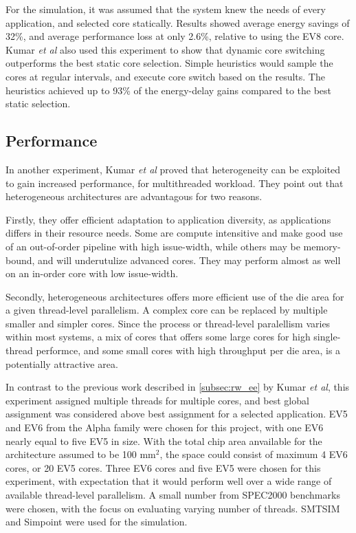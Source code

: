For the simulation, it was assumed that the system knew the needs of every application, and selected core statically. 
Results showed average energy savings of 32\%, and average performance loss at only 2.6\%, relative to using the EV8 core.
Kumar \textit{et al} also used this experiment to show that dynamic core switching outperforms the best static core selection.
Simple heuristics would sample the cores at regular intervals, and execute core switch based on the results.
The heuristics achieved up to 93\% of the energy-delay gains compared to the best static selection. 

\subsection{Performance}
\label{subsec:rw_perf}
In another experiment, Kumar \textit{et al}\cite{heterogeneous-perf} proved that heterogeneity can be exploited to gain increased performance, for multithreaded workload.
They point out that heterogeneous architectures are advantagous for two reasons.

Firstly, they offer efficient adaptation to application diversity, as applications differs in their resource needs.
Some are compute intensitive and make good use of an out-of-order pipeline with high issue-width, while others may be memory-bound, and will underutulize advanced cores.
They may perform almost as well on an in-order core with low issue-width\cite{heterogeneous-perf}.

Secondly, heterogeneous architectures offers more efficient use of the die area for a given thread-level parallelism.
A complex core can be replaced by multiple smaller and simpler cores. 
Since the process or thread-level paralellism varies within most systems, a mix of cores that offers some large cores for high single-thread performce, and some small cores with high throughput per die area, is a potentially attractive area. \cite{heterogeneous-perf}

In contrast to the previous work described in \ref{subsec:rw_ee} by Kumar \textit{et al}, this experiment assigned multiple threads for multiple cores, and best global assignment was considered above best assignment for a selected application.
EV5 and EV6 from the Alpha family were chosen for this project, with one EV6 nearly equal to five EV5 in size.
With the total chip area anvailable for the architecture assumed to be 100 mm$^2$, the space could consist of maximum 4 EV6 cores, or 20 EV5 cores.
Three EV6 cores and five EV5 were chosen for this experiment, with expectation that it would perform well over a wide range of available thread-level parallelism. 
A small number from SPEC2000 benchmarks were chosen, with the focus on evaluating varying number of threads.
SMTSIM and Simpoint were used for the simulation.

